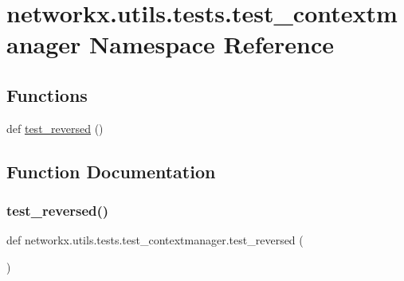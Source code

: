 \hypertarget{namespacenetworkx_1_1utils_1_1tests_1_1test__contextmanager}{}\section{networkx.\+utils.\+tests.\+test\+\_\+contextmanager Namespace Reference}
\label{namespacenetworkx_1_1utils_1_1tests_1_1test__contextmanager}
\subsection*{Functions}
\begin{DoxyCompactItemize}
\item 
def \hyperlink{namespacenetworkx_1_1utils_1_1tests_1_1test__contextmanager_aac3435541c4e94127c54d18d8965f278}{test\+\_\+reversed} ()
\end{DoxyCompactItemize}


\subsection{Function Documentation}
\mbox{\label{namespacenetworkx_1_1utils_1_1tests_1_1test__contextmanager_aac3435541c4e94127c54d18d8965f278}} 
\subsubsection{\texorpdfstring{test\+\_\+reversed()}{test\_reversed()}}
{\footnotesize\ttfamily def networkx.\+utils.\+tests.\+test\+\_\+contextmanager.\+test\+\_\+reversed (\begin{DoxyParamCaption}{ }\end{DoxyParamCaption})}

